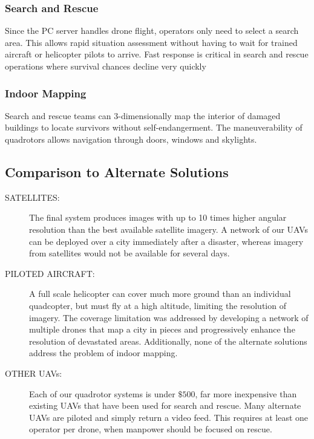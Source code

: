 \subsubsection{Search and Rescue}
Since the PC server handles drone flight, operators only need to select a search area. This allows rapid situation assessment without having to wait for trained aircraft or helicopter pilots to arrive. Fast response is critical in search and rescue operations where survival chances decline very quickly

\subsubsection{Indoor Mapping}
Search and rescue teams can 3-dimensionally map the interior of damaged buildings to locate survivors without self-endangerment. The maneuverability of quadrotors allows navigation through doors, windows and skylights.

\subsection{Comparison to Alternate Solutions}

\begin{description}
	\item[SATELLITES:] The final system produces images with up to 10 times higher angular resolution than the best available satellite imagery. A network of our UAVs can be deployed over a city immediately after a disaster, whereas imagery from satellites would not be available for several days.
	\item[PILOTED AIRCRAFT:] A full scale helicopter can cover much more ground than an individual quadcopter, but must fly at a high altitude, limiting the resolution of imagery. The coverage limitation was addressed by developing a network of multiple drones that map a city in pieces and progressively enhance the resolution of devastated areas. Additionally, none of the alternate solutions address the problem of indoor mapping.
	\item[OTHER UAVs:] Each of our quadrotor systems is under $\$500$, far more inexpensive than existing UAVs that have been used for search and rescue. Many alternate UAVs are piloted and simply return a video feed. This requires at least one operator per drone, when manpower should be focused on rescue.
\end{description}